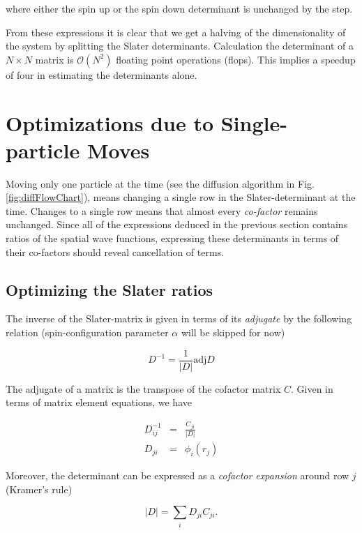 where either the spin up or the spin down determinant is unchanged by the step. 

From these expressions it is clear that we get a halving of the dimensionality of the system by splitting the Slater determinants. Calculation the determinant of a $N\times N$ matrix is $\mathcal{O}(N^2)$ floating point operations (flops). This implies a speedup of four in estimating the determinants alone. 

\section{Optimizations due to Single-particle Moves}

Moving only one particle at the time (see the diffusion algorithm in Fig. \ref{fig:diffFlowChart}), means changing a single row in the Slater-determinant at the time. Changes to a single row means that almost every \textit{co-factor} remains unchanged. Since all of the expressions deduced in the previous section contains ratios of the spatial wave functions, expressing these determinants in terms of their co-factors should reveal cancellation of terms. 

\subsection{Optimizing the Slater ratios}
\label{sec:optSlaterRat}

The inverse of the Slater-matrix is given in terms of its \textit{adjugate} by the following relation \cite{linAlg} (spin-configuration parameter $\alpha$ will be skipped for now)

\begin{equation*}
 D^{-1} = \frac{1}{|D|}\mathrm{adj} D
\end{equation*}

The adjugate of a matrix is the transpose of the cofactor matrix $C$. Given in terms of matrix element equations, we have

\begin{eqnarray}
 D^{-1}_{ij} &=& \frac{C_{ji}}{|D|}\label{eq:invExpCofac} \\
 D_{ji} &=& \phi_i(r_j) \label{eq:slaterMatPhi}
\end{eqnarray}

Moreover, the determinant can be expressed as a \textit{cofactor expansion} around row $j$ (Kramer's rule)

\begin{equation}
\label{eq:cofacExp}
 |D| = \sum_i D_{ji} C_{ji}.
\end{equation}

